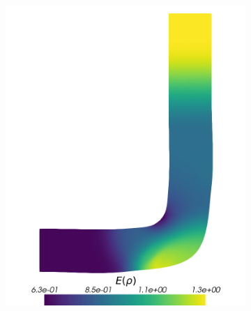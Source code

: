 \begin{figure}[H]
\begin{subfigure}{0.3\linewidth}
		\includegraphics[scale=0.18]{figs/pipe/euler2D_pipe_n1-4_tg1-3_ERho.png}
		\caption{}
		\label{fig:adIPMSolutionsPipeTGE}
	\end{subfigure}%
	\hfill
	\begin{subfigure}{0.3\linewidth}
		\centering

\end{subfigure}
\end{figure}
